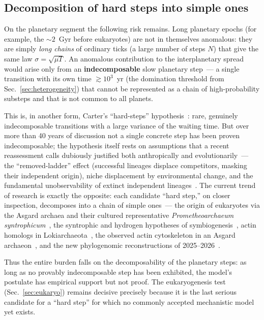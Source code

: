 \documentclass[11pt,a4paper]{article}
\begin{document}
\subsection{Decomposition of hard steps into simple ones}
\label{sec:planetary_steps}

On the planetary segment the following risk remains. Long planetary epochs (for example, the $\sim 2$~Gyr before eukaryotes) are not in themselves anomalous: they are simply \emph{long chains} of ordinary ticks (a large number of steps $N$) that give the same law $\sigma = \sqrt{\mu T}$. An anomalous contribution to the interplanetary spread would arise only from an \textbf{indecomposable} slow planetary step~--- a single transition with its own time $\gtrsim10^3$~yr (the domination threshold from Sec.~\ref{sec:heterogeneity}) that cannot be represented as a chain of high-probability substeps and that is not common to all planets.

This is, in another form, Carter's ``hard-steps'' hypothesis~\cite{Carter1983}: rare, genuinely indecomposable transitions with a large variance of the waiting time. But over more than 40 years of discussion not a single concrete step has been proven indecomposable; the hypothesis itself rests on assumptions that a recent reassessment calls dubiously justified both anthropically and evolutionarily~--- the ``removed-ladder'' effect (successful lineages displace competitors, masking their independent origin), niche displacement by environmental change, and the fundamental unobservability of extinct independent lineages~\cite{Mills2025}. The current trend of research is exactly the opposite: each candidate ``hard step,'' on closer inspection, decomposes into a chain of simple ones~--- the origin of eukaryotes via the Asgard archaea and their cultured representative \emph{Prometheoarchaeum syntrophicum}~\cite{Spang2015,Zaremba2017,Imachi2020}, the syntrophic and hydrogen hypotheses of symbiogenesis~\cite{Martin1998,LopezGarcia2020}, actin homologs in Lokiarchaeota~\cite{Spang2015}, the observed actin cytoskeleton in an Asgard archaeon~\cite{Rodrigues2023}, and the new phylogenomic reconstructions of 2025--2026~\cite{Tobiasson2026,Speijer2025,BravoArevalo2025}.

Thus the entire burden falls on the decomposability of the planetary steps: as long as no provably indecomposable step has been exhibited, the model's postulate has empirical support but not proof. The eukaryogenesis test (Sec.~\ref{sec:eukaryo}) remains decisive precisely because it is the last serious candidate for a ``hard step'' for which no commonly accepted mechanistic model yet exists.
\end{document}

